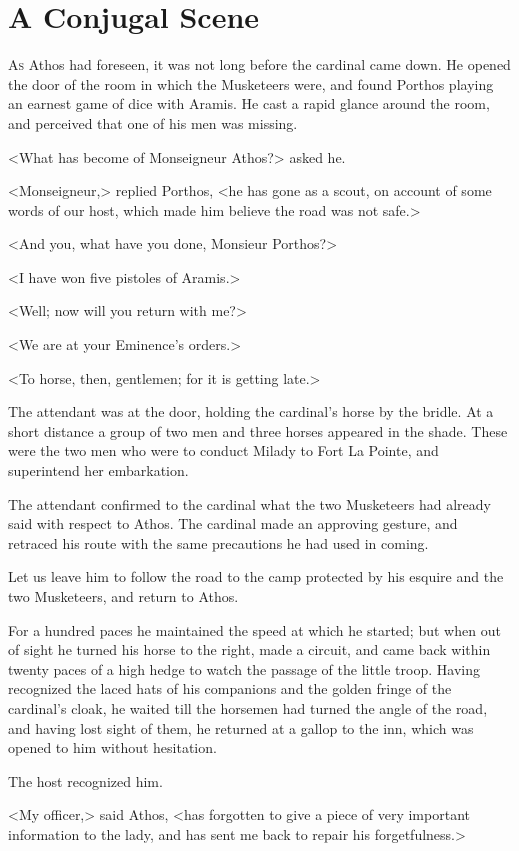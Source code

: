 
\chapter{A Conjugal Scene}

\lettrine{A}{s} Athos had foreseen, it was not long before the cardinal came down. He opened the door of the room in which the Musketeers were, and found Porthos playing an earnest game of dice with Aramis. He cast a rapid glance around the room, and perceived that one of his men was missing. 

<What has become of Monseigneur Athos?> asked he. 

<Monseigneur,> replied Porthos, <he has gone as a scout, on account of some words of our host, which made him believe the road was not safe.> 

<And you, what have you done, Monsieur Porthos?> 

<I have won five pistoles of Aramis.> 

<Well; now will you return with me?> 

<We are at your Eminence's orders.> 

<To horse, then, gentlemen; for it is getting late.> 

The attendant was at the door, holding the cardinal's horse by the bridle. At a short distance a group of two men and three horses appeared in the shade. These were the two men who were to conduct Milady to Fort La Pointe, and superintend her embarkation. 

The attendant confirmed to the cardinal what the two Musketeers had already said with respect to Athos. The cardinal made an approving gesture, and retraced his route with the same precautions he had used in coming. 

Let us leave him to follow the road to the camp protected by his esquire and the two Musketeers, and return to Athos. 

For a hundred paces he maintained the speed at which he started; but when out of sight he turned his horse to the right, made a circuit, and came back within twenty paces of a high hedge to watch the passage of the little troop. Having recognized the laced hats of his companions and the golden fringe of the cardinal's cloak, he waited till the horsemen had turned the angle of the road, and having lost sight of them, he returned at a gallop to the inn, which was opened to him without hesitation. 

The host recognized him. 

<My officer,> said Athos, <has forgotten to give a piece of very important information to the lady, and has sent me back to repair his forgetfulness.> 

